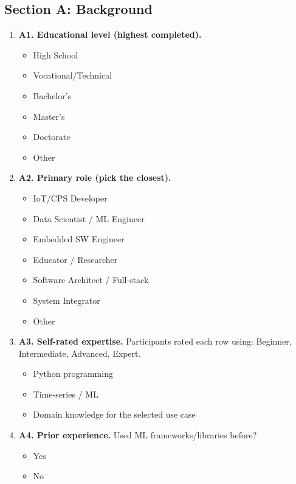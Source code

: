 \subsection{Section A: Background}
\label{app:stage1_background_questions}

\begin{enumerate}[leftmargin=*]
    \item \textbf{A1. Educational level (highest completed).}
    \begin{itemize}
        \item High School
        \item Vocational/Technical
        \item Bachelor's
        \item Master's
        \item Doctorate
        \item Other
    \end{itemize}

    \item \textbf{A2. Primary role (pick the closest).}
    \begin{itemize}
        \item IoT/CPS Developer
        \item Data Scientist / ML Engineer
        \item Embedded SW Engineer
        \item Educator / Researcher
        \item Software Architect / Full-stack
        \item System Integrator
        \item Other
    \end{itemize}

    \item \textbf{A3. Self-rated expertise.}
    Participants rated each row using: Beginner, Intermediate, Advanced, Expert.
    \begin{itemize}
        \item Python programming
        \item Time-series / ML
        \item Domain knowledge for the selected use case
    \end{itemize}

    \item \textbf{A4. Prior experience.}
    Used ML frameworks/libraries before?
    \begin{itemize}
        \item Yes
        \item No
    \end{itemize}
\end{enumerate}

